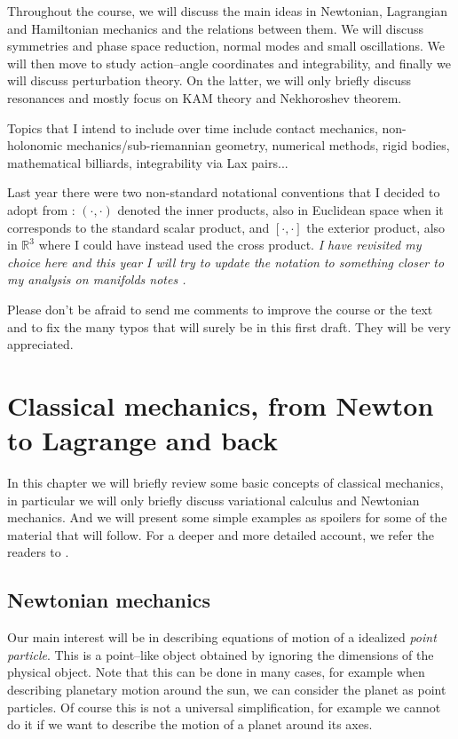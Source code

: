 \documentclass[english,fontsize=11pt,paper=a5,oneside]{scrbook}
\newcommand{\R}{\mathbb{R}}
\theoremstyle{definition}
\begin{document}
Throughout the course, we will discuss the main ideas in Newtonian, Lagrangian and Hamiltonian mechanics and the relations between them.
We will discuss symmetries and phase space reduction, normal modes and small oscillations.
We will then move to study action--angle coordinates and integrability, and finally we will discuss perturbation theory.
On the latter, we will only briefly discuss resonances and mostly focus on KAM theory and Nekhoroshev theorem.

Topics that I intend to include over time include contact mechanics, non-holonomic mechanics/sub-riemannian geometry, numerical methods, rigid bodies, mathematical billiards, integrability via Lax pairs...

Last year there were two non-standard notational conventions that I decided to adopt from \cite{book:arnold}: $(\cdot,\cdot)$ denoted the inner products, also in Euclidean space when it corresponds to the standard scalar product, and $[\cdot,\cdot]$ the exterior product, also in $\R^3$ where I could have instead used the cross product. \emph{I have revisited my choice here and this year I will try to update the notation to something closer to my analysis on manifolds notes \cite{lectures:aom:seri}.}

Please don't be afraid to send me comments to improve the course or the text and to fix the many typos that will surely be in this first draft. They will be very appreciated.

\chapter{Classical mechanics, from Newton to Lagrange and back}

In this chapter we will briefly review some basic concepts of classical mechanics, in particular we will only briefly discuss variational calculus and Newtonian mechanics.
And we will present some simple examples as spoilers for some of the material that will follow.
For a deeper and more detailed account, we refer the readers to \cite{book:arnold,book:knauf}.

\section{Newtonian mechanics}

Our main interest will be in describing equations of motion of a idealized \emph{point particle}.
This is a point--like object obtained by ignoring the dimensions of the physical object. Note that this can be done in many cases, for example when describing planetary motion around the sun, we can consider the planet as point particles.
Of course this is not a universal simplification, for example we cannot do it if we want to describe the motion of a planet around its axes.
\end{document}

